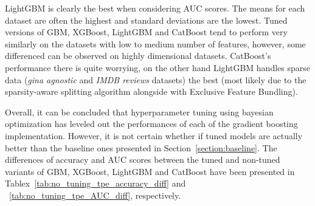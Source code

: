 \documentclass[magisterska, english]{pwr_wmat_praca_dyplomowa}
\theoremstyle{plain}
\numberwithin{theorem}{chapter}
\theoremstyle{definition}
\numberwithin{theorem}{chapter}
\newcommand{\gbm}{GBM, XGBoost, LightGBM and CatBoost }
\begin{document}
LightGBM is clearly the best when considering AUC scores. The means for each dataset are often the highest and standard deviations are the lowest. Tuned versions of \gbm tend to perform very similarly on the datasets with low to medium number of features, however, some differenced can be observed on highly dimensional datasets. CatBoost's performance there is quite worrying, on the other hand LightGBM handles sparse data (\emph{gina agnostic} and \emph{IMDB reviews} datasets) the best (most likely due to the sparsity-aware splitting algorithm alongside with Exclusive Feature Bundling).

Overall, it can be concluded that hyperparameter tuning using bayesian optimization has leveled out the performances of each of the gradient boosting implementation. However, it is not certain whether if tuned models are actually better than the baseline ones presented in Section~\ref{section:baseline}. The differences of accuracy and AUC scores between the tuned and non-tuned variants of \gbm have been presented in  Tablex~\ref{tab:no_tuning_tpe_accuracy_diff} and ~\ref{tab:no_tuning_tpe_AUC_diff}, respectively.
\end{document}
